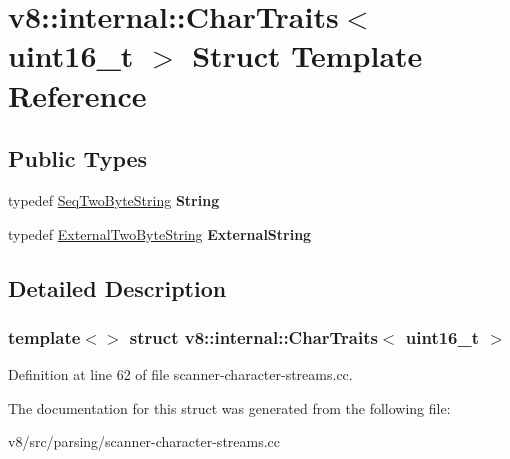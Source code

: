 \hypertarget{structv8_1_1internal_1_1CharTraits_3_01uint16__t_01_4}{}\section{v8\+:\+:internal\+:\+:Char\+Traits$<$ uint16\+\_\+t $>$ Struct Template Reference}
\label{structv8_1_1internal_1_1CharTraits_3_01uint16__t_01_4}
\subsection*{Public Types}
\begin{DoxyCompactItemize}
\item 
\mbox{\label{structv8_1_1internal_1_1CharTraits_3_01uint16__t_01_4_af1f56aca4fa7d24704fdafc93503792e}} 
typedef \mbox{\hyperlink{classv8_1_1internal_1_1SeqTwoByteString}{Seq\+Two\+Byte\+String}} {\bfseries String}
\item 
\mbox{\label{structv8_1_1internal_1_1CharTraits_3_01uint16__t_01_4_ad9433a2aa22d94764cc54fd430c6fcfc}} 
typedef \mbox{\hyperlink{classv8_1_1internal_1_1ExternalTwoByteString}{External\+Two\+Byte\+String}} {\bfseries External\+String}
\end{DoxyCompactItemize}


\subsection{Detailed Description}
\subsubsection*{template$<$$>$\newline
struct v8\+::internal\+::\+Char\+Traits$<$ uint16\+\_\+t $>$}



Definition at line 62 of file scanner-\/character-\/streams.\+cc.



The documentation for this struct was generated from the following file\+:\begin{DoxyCompactItemize}
\item 
v8/src/parsing/scanner-\/character-\/streams.\+cc\end{DoxyCompactItemize}
